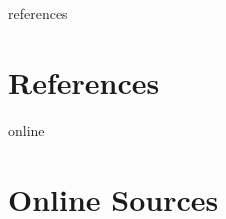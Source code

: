 \documentclass[12pt,a4paper,twoside]{report}
\begin{document}
\newpage

\listoffigures
\newpage

\begin{btSect}{references}
\section*{\huge{References}}
\btPrintCited
\end{btSect}
\begin{btSect}{online}
\section*{\huge{Online Sources}}
\btPrintCited
\end{btSect}
\end{document}
